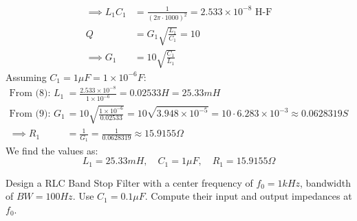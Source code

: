 \begin{enumerate}
\begin{align*}
      \implies L_1 C_1 &= \frac{1}{(2\pi \cdot 1000)^2} = 2.533 \times 10^{-8} \text{ H-F} \tag{8} \\
      Q &= G_1 \sqrt{\frac{L_1}{C_1}} = 10 \\
      \implies G_1 &= 10 \sqrt{\frac{C_1}{L_1}} \tag{9}
    \end{align*}
    Assuming \(C_1 = 1 \mu F = 1 \times 10^{-6} F\):
    \begin{align*}
      \text{From (8): } L_1 &= \frac{2.533 \times 10^{-8}}{1 \times 10^{-6}} = 0.02533 H = 25.33 mH \\
      \text{From (9): } G_1 &= 10 \sqrt{\frac{1 \times 10^{-6}}{0.02533}} = 10 \sqrt{3.948 \times 10^{-5}} = 10 \cdot 6.283 \times 10^{-3} \approx 0.0628319 S \\
      \implies R_1 &= \frac{1}{G_1} = \frac{1}{0.0628319} \approx 15.9155 \Omega
    \end{align*}
    We find the values as:
    \[
      L_1 = 25.33 mH, \quad C_1 = 1 \mu F, \quad R_1 = 15.9155 \Omega
    \]
\end{enumerate}
Design a RLC Band Stop Filter with a center frequency of
\(f_0 = 1kHz\), bandwidth of \(BW = 100Hz\). Use \(C_1 = 0.1\mu F\).
Compute their input and output impedances at \(f_0\).
